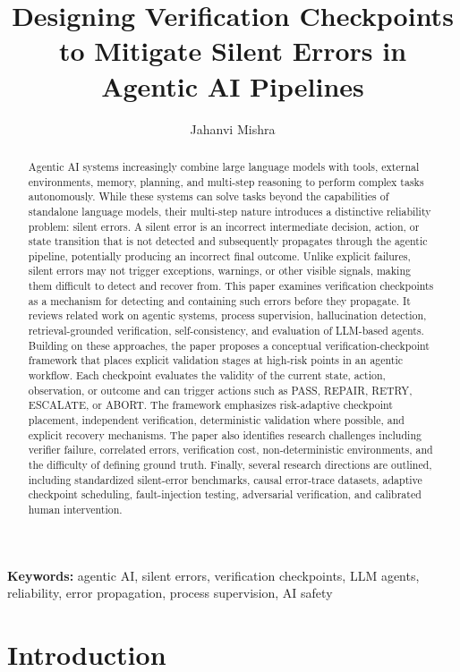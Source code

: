 \documentclass[12pt]{article}
\title{Designing Verification Checkpoints to Mitigate Silent Errors in Agentic AI Pipelines}
\author{Jahanvi Mishra}
\date{}
\begin{document}
\maketitle

\begin{abstract}
Agentic AI systems increasingly combine large language models with tools, external
environments, memory, planning, and multi-step reasoning to perform complex tasks
autonomously. While these systems can solve tasks beyond the capabilities of
standalone language models, their multi-step nature introduces a distinctive
reliability problem: silent errors. A silent error is an incorrect intermediate
decision, action, or state transition that is not detected and subsequently
propagates through the agentic pipeline, potentially producing an incorrect final
outcome. Unlike explicit failures, silent errors may not trigger exceptions,
warnings, or other visible signals, making them difficult to detect and recover
from. This paper examines verification checkpoints as a mechanism for detecting
and containing such errors before they propagate. It reviews related work on
agentic systems, process supervision, hallucination detection, retrieval-grounded
verification, self-consistency, and evaluation of LLM-based agents. Building on
these approaches, the paper proposes a conceptual verification-checkpoint
framework that places explicit validation stages at high-risk points in an
agentic workflow. Each checkpoint evaluates the validity of the current state,
action, observation, or outcome and can trigger actions such as PASS, REPAIR,
RETRY, ESCALATE, or ABORT. The framework emphasizes risk-adaptive checkpoint
placement, independent verification, deterministic validation where possible, and
explicit recovery mechanisms. The paper also identifies research challenges
including verifier failure, correlated errors, verification cost,
non-deterministic environments, and the difficulty of defining ground truth.
Finally, several research directions are outlined, including standardized
silent-error benchmarks, causal error-trace datasets, adaptive checkpoint
scheduling, fault-injection testing, adversarial verification, and calibrated
human intervention.
\end{abstract}

\textbf{Keywords:} agentic AI, silent errors, verification checkpoints, LLM agents,
reliability, error propagation, process supervision, AI safety

\section{Introduction}
\label{sec:introduction}
\end{document}
